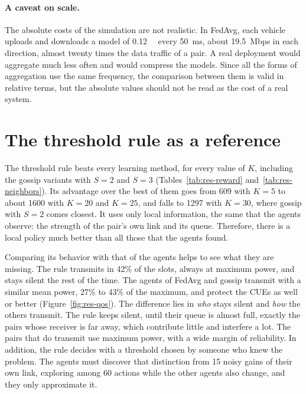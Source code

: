 \paragraph{A caveat on scale.} The absolute costs of the simulation are not realistic. In \ac{FedAvg}, each
vehicle uploads and downloads a model of \SI{0.12}{\mega\byte} every \SI{50}{\milli\second}, about
\SI{19.5}{Mbps} in each direction, almost twenty times the data traffic of a pair. A real deployment would
aggregate much less often and would compress the models. Since all the forms of aggregation use the same
frequency, the comparison between them is valid in relative terms, but the absolute values should not be read
as the cost of a real system.

\section{The threshold rule as a reference}
\label{sec:res-threshold}

The threshold rule beats every learning method, for every value of $K$, including the gossip variants with
$S = 2$ and $S = 3$ (Tables~\ref{tab:res-reward} and~\ref{tab:res-neighbors}). Its advantage over the best of
them goes from 609 with $K = 5$ to about 1600 with $K = 20$ and $K = 25$, and falls to 1297 with $K = 30$,
where gossip with $S = 2$ comes closest. It uses only local
information, the same that the agents observe: the strength of the pair's own link and its queue. Therefore,
there is a local policy much better than all those that the agents found.

Comparing its behavior with that of the agents helps to see what they are missing. The rule transmits in
42\% of the slots, always at maximum power, and stays silent the rest of the time. The agents of \ac{FedAvg}
and gossip transmit with a similar mean power, 27\% to 43\% of the maximum, and protect the \acp{CUE} as well
or better (Figure~\ref{fig:res-qos}). The difference lies in \emph{who} stays silent and \emph{how} the others
transmit. The rule keeps silent, until their queue is almost full, exactly the pairs whose receiver is far
away, which contribute little and interfere a lot. The pairs that do transmit use maximum power, with a wide
margin of reliability. In
addition, the rule decides with a threshold chosen by someone who knew the problem. The agents must discover
that distinction from 15 noisy gains of their own link, exploring among 60 actions while the other agents
also change, and they only approximate it.

